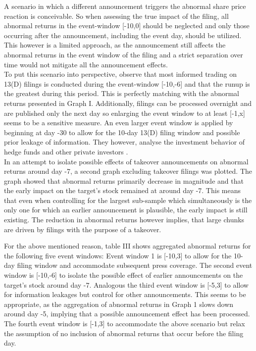 \documentclass[12pt]{article}
\begin{document}
A scenario in which a different announcement triggers the abnormal share price reaction is conceivable. So when assessing the true impact of the filing, all abnormal returns in the event-window [-10,0] should be neglected and only those occurring after the announcement, including the event day, should be utilized. This however is a limited approach, as the announcement still affects the abnormal returns in the event window of the filing and a strict separation over time would not mitigate all the announcement effects.\\
To put this scenario into perspective, \citet[p.32]{Brigida2012} observe that most informed trading on 13(D) filings is conducted during the event-window [-10,-6] and that the runup is the greatest during this period. This is perfectly matching with the abnormal returns presented in Graph I. Additionally, filings can be processed overnight and are published only the next day so enlarging the event window to at least [-1,x] seems to be a sensitive measure. An even larger event window is applied by \citet[207]{Klein2009} beginning at day -30 to allow for the 10-day 13(D) filing window and possible prior leakage of information. They however, analyse the investment behavior of hedge funds and other private investors . \\
In an attempt to isolate possible effects of takeover announcements on abnormal returns around day -7, a second graph excluding takeover filings was plotted. The graph showed that abnormal returns primarily decrease in magnitude and that the early impact on the target's stock remained at around day -7. This means that even when controlling for the largest sub-sample which simultaneously is the only one for which an earlier announcement is plausible, the early impact is still existing. The reduction in abnormal returns however implies, that large chunks are driven by filings with the purpose of a takeover. 

For the above mentioned reason, table III shows aggregated abnormal returns for the following five event windows: Event window 1 is [-10,3] to allow for the 10-day filing window and accommodate subsequent press coverage. The second event window is [-10,-6] to isolate the possible effect of earlier announcements on the target's stock around day -7. Analogous the third event window is [-5,3] to allow for information leakages but control for other announcements. This seems to be appropriate, as the aggregation of abnormal returns in Graph 1 slows down around day -5, implying that a possible announcement effect has been processed. The fourth event window is [-1,3] to accommodate the above scenario but relax the assumption of no inclusion of abnormal returns that occur before the filing day. 
\end{document}

